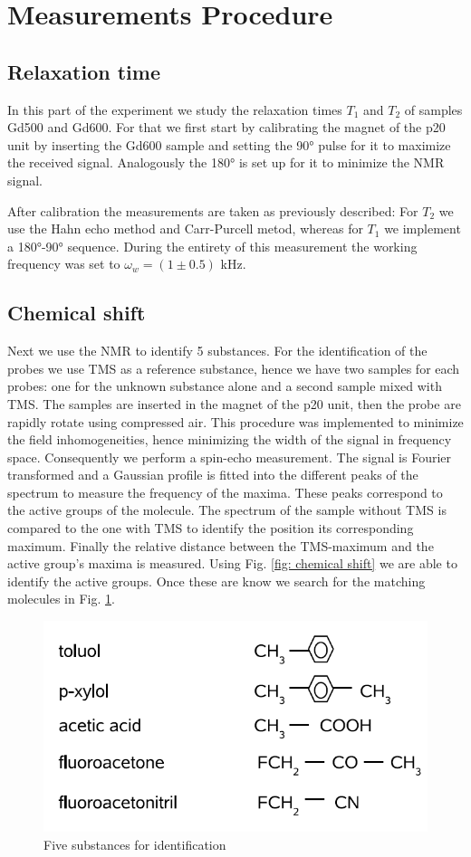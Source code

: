 \section{Measurements Procedure}
\subsection{Relaxation time}
In this part of the experiment we study the relaxation times $T_1$ and $T_2$ of samples Gd500 and Gd600. For that we first start by calibrating the magnet of the p20 unit by inserting the Gd600 sample and setting the 90° pulse for it to maximize the received signal. Analogously the 180° is set up for it to minimize the NMR signal. 

After calibration the measurements are taken as previously described: For $T_2$ we use the Hahn echo method and Carr-Purcell metod, whereas for $T_1$ we implement a 180°-90° sequence. 
During the entirety of this measurement the working frequency was set to $\omega_w = (1 \pm 0.5)$ kHz.
\subsection{Chemical shift}
\label{sec: chemical shift}
Next we use the NMR to identify 5 substances. For the identification of the probes we use TMS as a reference substance, hence we have two samples for each probes: one for the unknown substance alone and a second sample mixed with TMS.
The samples are inserted in the magnet of the p20 unit, then the probe are rapidly rotate using compressed air. This procedure was implemented to minimize the field inhomogeneities, hence minimizing the width of the signal in frequency space. Consequently we perform a spin-echo measurement. The signal is Fourier transformed and a Gaussian profile is fitted into the different peaks of the spectrum to measure the frequency of the maxima. These peaks correspond to the active groups of the molecule.
The spectrum of the sample without TMS is compared to the one with TMS to identify the position its corresponding maximum. Finally the relative distance between the TMS-maximum and the active group's maxima is measured. Using Fig. \ref{fig: chemical shift} we are able to identify the active groups. Once these are know we search for the matching molecules in Fig. \ref{fig: identification}.
\begin{figure}[!htbp]
 \begin{center}
  \includegraphics[width = .6\textwidth]{Latex images/molecules.png}
  \caption[]{Five substances for identification \footnotemark}
    \label{fig: identification}
 \end{center}
\end{figure}
